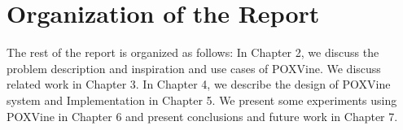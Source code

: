 \section{Organization of the Report}
The rest of the report is organized as follows: In Chapter 2, we discuss the problem description and inspiration and use cases of POXVine. We discuss related work in Chapter 3. In Chapter 4, we describe the design of POXVine system and Implementation in Chapter 5. We present some experiments using POXVine in Chapter 6 and present conclusions and future work in Chapter 7.  



